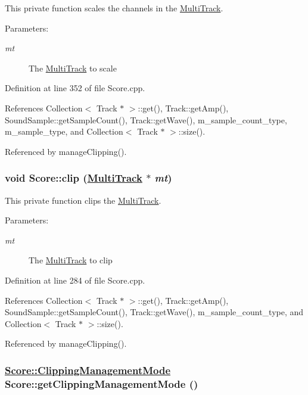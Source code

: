 This private function scales the channels in the \hyperlink{classMultiTrack}{Multi\-Track}. \begin{Desc}
\item[Parameters:]
\begin{description}
\item[{\em mt}]The \hyperlink{classMultiTrack}{Multi\-Track} to scale \end{description}
\end{Desc}


Definition at line 352 of file Score.cpp.

References Collection$<$ Track $\ast$ $>$::get(), Track::get\-Amp(), Sound\-Sample::get\-Sample\-Count(), Track::get\-Wave(), m\_\-sample\_\-count\_\-type, m\_\-sample\_\-type, and Collection$<$ Track $\ast$ $>$::size().

Referenced by manage\-Clipping().\hypertarget{classScore_h0}{
\subsubsection[clip]{\setlength{\rightskip}{0pt plus 5cm}void Score::clip (\hyperlink{classMultiTrack}{Multi\-Track} $\ast$ {\em mt})}}
\label{classScore_h0}


This private function clips the \hyperlink{classMultiTrack}{Multi\-Track}. \begin{Desc}
\item[Parameters:]
\begin{description}
\item[{\em mt}]The \hyperlink{classMultiTrack}{Multi\-Track} to clip \end{description}
\end{Desc}


Definition at line 284 of file Score.cpp.

References Collection$<$ Track $\ast$ $>$::get(), Track::get\-Amp(), Sound\-Sample::get\-Sample\-Count(), Track::get\-Wave(), m\_\-sample\_\-count\_\-type, and Collection$<$ Track $\ast$ $>$::size().

Referenced by manage\-Clipping().\hypertarget{classScore_a4}{
\subsubsection[getClippingManagementMode]{\setlength{\rightskip}{0pt plus 5cm}\hyperlink{classScore_w6}{Score::Clipping\-Management\-Mode} Score::get\-Clipping\-Management\-Mode ()}}
\label{classScore_a4}


